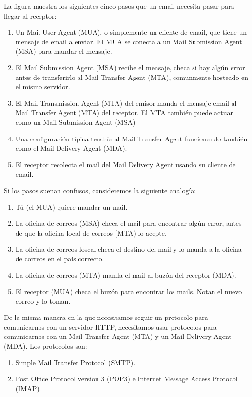 \documentclass[12pt]{report}
\begin{document}
La figura muestra los siguientes cinco pasos que un email necesita pasar para llegar 
al receptor:

\begin{enumerate}
  \item Un Mail User Agent (MUA), o simplemente un cliente de email, que tiene un 
    mensaje de email a enviar. El MUA se conecta a un Mail Submission Agent (MSA)
    para mandar el mensaje.
  \item El Mail Submission Agent (MSA) recibe el mensaje, checa si hay algún error antes 
    de transferirlo al Mail Transfer Agent (MTA), comunmente hosteado en el mismo servidor.
  \item El Mail Transmission Agent (MTA) del emisor manda el mensaje email al Mail Transfer 
    Agent (MTA) del receptor. El MTA también puede actuar como un Mail Submission Agent (MSA).
  \item Una configuración típica tendría al Mail Transfer Agent funcionando también como el Mail 
    Delivery Agent (MDA).
  \item El receptor recolecta el mail del Mail  Delivery Agent usando su cliente de email.
\end{enumerate}
 Si los pasos suenan confusos, consideremos la siguiente analogía:
\begin{enumerate}
  \item Tú (el MUA) quiere mandar un mail.
  \item La oficina de correos (MSA) checa el mail para encontrar algún error, antes de que 
    la oficina local de correos (MTA) lo acepte.
  \item La oficina de correos loscal checa el destino del mail y lo manda a la oficina de correos
     en el país correcto.
  \item La oficina de correos (MTA) manda el mail al buzón del receptor (MDA).
  \item El receptor (MUA) checa el buzón para encontrar los mails. Notan el nuevo correo y lo toman. 
\end{enumerate}

De la misma manera en la que necesitamos seguir un protocolo para comunicarnos con un servidor
HTTP, necesitamos usar protocolos para comunicarnos con un Mail Transfer Agent (MTA) y un Mail Delivery Agent (MDA).
Los protocolos son:
\begin{enumerate}
  \item Simple Mail Transfer Protocol (SMTP).
  \item Post Office Protocol version 3 (POP3) e Internet Message Access Protocol (IMAP).
\end{enumerate}
\end{document}
